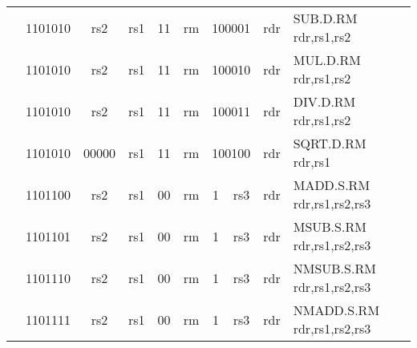 \begin{table}[p]
\begin{small}
\begin{center}
\begin{tabular}{rcccccccccccl}
&
\multicolumn{2}{|c|}{1101010} &
\multicolumn{1}{c|}{rs2} &
\multicolumn{1}{c|}{rs1} &
\multicolumn{1}{c|}{11} &
\multicolumn{2}{c|}{rm} &
\multicolumn{3}{c|}{100001} &
\multicolumn{1}{c|}{rdr} & SUB.D.RM rdr,rs1,rs2 \\
\cline{2-12}
  

&
\multicolumn{2}{|c|}{1101010} &
\multicolumn{1}{c|}{rs2} &
\multicolumn{1}{c|}{rs1} &
\multicolumn{1}{c|}{11} &
\multicolumn{2}{c|}{rm} &
\multicolumn{3}{c|}{100010} &
\multicolumn{1}{c|}{rdr} & MUL.D.RM rdr,rs1,rs2 \\
\cline{2-12}
  

&
\multicolumn{2}{|c|}{1101010} &
\multicolumn{1}{c|}{rs2} &
\multicolumn{1}{c|}{rs1} &
\multicolumn{1}{c|}{11} &
\multicolumn{2}{c|}{rm} &
\multicolumn{3}{c|}{100011} &
\multicolumn{1}{c|}{rdr} & DIV.D.RM rdr,rs1,rs2 \\
\cline{2-12}
  

&
\multicolumn{2}{|c|}{1101010} &
\multicolumn{1}{c|}{00000} &
\multicolumn{1}{c|}{rs1} &
\multicolumn{1}{c|}{11} &
\multicolumn{2}{c|}{rm} &
\multicolumn{3}{c|}{100100} &
\multicolumn{1}{c|}{rdr} & SQRT.D.RM rdr,rs1 \\
\cline{2-12}
  

&
\multicolumn{2}{|c|}{1101100} &
\multicolumn{1}{c|}{rs2} &
\multicolumn{1}{c|}{rs1} &
\multicolumn{1}{c|}{00} &
\multicolumn{2}{c|}{rm} &
\multicolumn{1}{c|}{1} &
\multicolumn{2}{c|}{rs3} &
\multicolumn{1}{c|}{rdr} & MADD.S.RM rdr,rs1,rs2,rs3 \\
\cline{2-12}
  

&
\multicolumn{2}{|c|}{1101101} &
\multicolumn{1}{c|}{rs2} &
\multicolumn{1}{c|}{rs1} &
\multicolumn{1}{c|}{00} &
\multicolumn{2}{c|}{rm} &
\multicolumn{1}{c|}{1} &
\multicolumn{2}{c|}{rs3} &
\multicolumn{1}{c|}{rdr} & MSUB.S.RM rdr,rs1,rs2,rs3 \\
\cline{2-12}
  

&
\multicolumn{2}{|c|}{1101110} &
\multicolumn{1}{c|}{rs2} &
\multicolumn{1}{c|}{rs1} &
\multicolumn{1}{c|}{00} &
\multicolumn{2}{c|}{rm} &
\multicolumn{1}{c|}{1} &
\multicolumn{2}{c|}{rs3} &
\multicolumn{1}{c|}{rdr} & NMSUB.S.RM rdr,rs1,rs2,rs3 \\
\cline{2-12}
  

&
\multicolumn{2}{|c|}{1101111} &
\multicolumn{1}{c|}{rs2} &
\multicolumn{1}{c|}{rs1} &
\multicolumn{1}{c|}{00} &
\multicolumn{2}{c|}{rm} &
\multicolumn{1}{c|}{1} &
\multicolumn{2}{c|}{rs3} &
\multicolumn{1}{c|}{rdr} & NMADD.S.RM rdr,rs1,rs2,rs3 \\
\cline{2-12}
  


\end{tabular}
\end{center}
\end{small}
\end{table}
